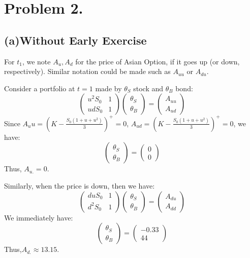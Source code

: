 \documentclass{article}
\begin{document}
\section{Problem 2.}
\subsection{(a)Without Early Exercise}
For $t_1$, we note $A_u, A_d$ for the price of Asian Option, if it goes up (or down, respectively). Similar notation could be made such as $A_{uu}$ or $A_{du}$. 

Consider a portfolio at $t=1$ made by $\theta_S$ stock and $\theta_B$ bond: 
\begin{equation}
  \begin{pmatrix}
  u^2S_0 & 1\\
  udS_0 & 1
  \end{pmatrix}
  \begin{pmatrix}
    \theta_S\\
    \theta_B
  \end{pmatrix}
  =
  \begin{pmatrix}
    A_{uu}\\
    A_{ud}
  \end{pmatrix}
\end{equation}
Since $A_uu = (K - \frac{S_0(1+u+u^2)}{3})^+ = 0$, $A_{ud} = (K - \frac{S_0(1+u+u^2)}{3})^+ = 0$, we have:
\begin{equation}
  \begin{pmatrix}
    \theta_S \\
    \theta_B
  \end{pmatrix}
  =
  \begin{pmatrix}
    0\\
    0
  \end{pmatrix}
\end{equation}
Thus, $A_{u.} = 0$.

Similarly, when the price is down, then we have:
\begin{equation}
  \begin{pmatrix}
  duS_0 & 1\\
  d^2S_0 & 1
  \end{pmatrix}
  \begin{pmatrix}
    \theta_S\\
    \theta_B
  \end{pmatrix}
  =
  \begin{pmatrix}
    A_{du}\\
    A_{dd}
  \end{pmatrix}
\end{equation}
We immediately have:
\begin{equation}
  \begin{pmatrix}
    \theta_S\\
    \theta_B
  \end{pmatrix}
  =
  \begin{pmatrix}
    -0.33\\
    44
  \end{pmatrix}
\end{equation}
Thus,$A_{d.} \approx 13.15$.
\end{document}
